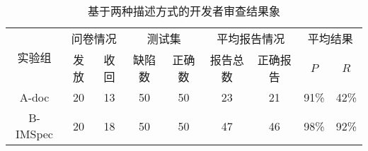\begin{table}[t]
	\centering
	\begin{minipage}[t]{0.95\linewidth} %
		\caption{基于两种描述方式的开发者审查结果象}
		\label{tab:2-5-survey}
			\begin{tabular}{ccccccccc}
			\hline
			\multirow{2}{*}{实验组} & \multicolumn{2}{c}{问卷情况} & \multicolumn{2}{c}{测试集} & \multicolumn{2}{c}{平均报告情况} & \multicolumn{2}{c}{平均结果} \\
			\cline{2-9}
			& 发放 & 收回 & 缺陷数& 正确数& 报告总数 & 正确报告 & $P$ & $R$ \\
			\hline
		A-doc	& 20 & 13 & 50& 50& 23 & 21 & 91\% & 42\% \\
		 B-IMSpec	& 20 & 18 & 50& 50& 47 & 46 & 98\% & 92\% \\
			\hline
		\end{tabular}
	\end{minipage}
\end{table}